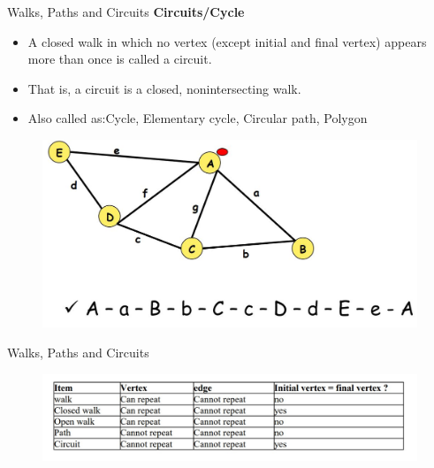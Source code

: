\documentclass{beamer}
\begin{document}
\begin{frame}{Walks, Paths and Circuits}
	\textbf{Circuits/Cycle}
	\begin{itemize}
		\item A closed walk in which no vertex (except initial and final vertex) appears more than 
		once is called a circuit. \item That is, a circuit is a closed, nonintersecting walk. 
		\item Also called as:Cycle, Elementary cycle,
		Circular path, Polygon
	\end{itemize}
	
	\begin{figure}
		\includegraphics[scale=.3]{img/m31}
	\end{figure}
\end{frame}
\begin{frame}{Walks, Paths and Circuits}
	\begin{figure}
		\includegraphics[scale=.5
		]{img/m43}
	\end{figure}
\end{frame}
\end{document}
